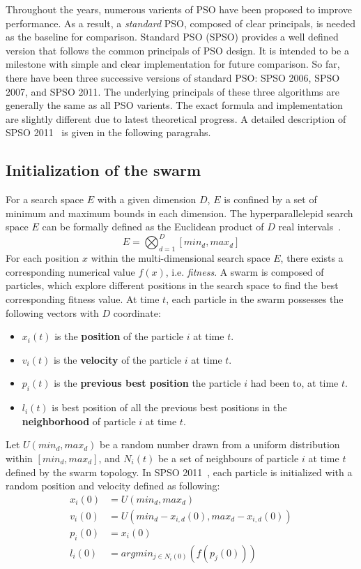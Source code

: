Throughout the years, numerous varients of PSO have been proposed to improve performance.
As a result, a \textit{standard} PSO, composed of clear principals, is needed as the baseline for comparison.
Standard PSO (SPSO) provides a well defined version that follows the common principals of PSO design.
It is intended to be a milestone with simple and clear implementation for future comparison. %
So far, there have been three successive versions of standard PSO: SPSO 2006, SPSO 2007, and SPSO 2011.
The underlying principals of these three algorithms are generally the same as all PSO varients.
The exact formula and implementation are slightly different due to latest theoretical progress.
A detailed description of SPSO 2011~\cite{Zambrano:2013:SPSO2011} is given in the following paragrahs.

\subsection{Initialization of the swarm}

For a search space $E$ with a given dimension $D$, $E$ is confined by a set of minimum and maximum bounds in each dimension.
The hyperparallelepid search space $E$ can be formally defined as the Euclidean product of $D$ real intervals~\cite{Clerc:2012:SPSO2011}.
\begin{displaymath}
E = \bigotimes_{d=1}^{D}[min_d, max_d]
\end{displaymath}
For each position $x$ within the multi-dimensional search space $E$, there exists a corresponding numerical value $f(x)$, i.e. \textit{fitness}.
A swarm is composed of particles, which explore different positions in the search space to find the best corresponding fitness value.
At time $t$, each particle in the swarm possesses the following vectors with $D$ coordinate:
\begin{itemize}
\item $x_i(t)$ is the \textbf{position} of the particle $i$ at time $t$.
\item $v_i(t)$ is the \textbf{velocity} of the particle $i$ at time $t$.
\item $p_i(t)$ is the \textbf{previous best position} the particle $i$ had been to, at time $t$.
\item $l_i(t)$ is best position of all the previous best positions in the \textbf{neighborhood} of particle $i$ at time $t$.
\end{itemize}

Let $U(min_d, max_d)$ be a random number drawn from a uniform distribution within $[min_d, max_d]$, 
and $N_i(t)$ be a set of neighbours of particle $i$ at time $t$ defined by the swarm topology.
In SPSO 2011~\cite{Clerc:2012:SPSO2011}, each particle is initialized with a random position and velocity defined as following:
\begin{align*}
x_i(0) &= U(min_d, max_d) \\
v_i(0) &= U(min_d - x_{i,d}(0), max_d - x_{i,d}(0)) \\
p_i(0) &= x_i(0) \\ 
l_i(0) &= argmin_{j \in N_i(0)}(f(p_j(0)))
\end{align*}


